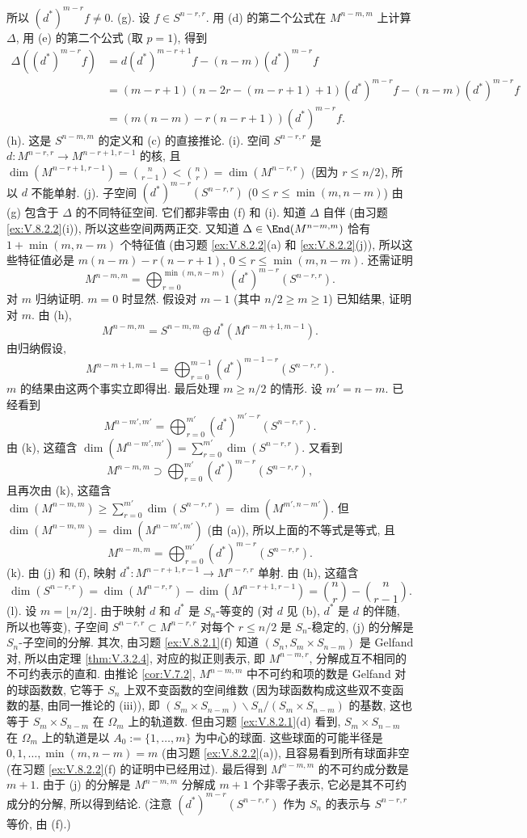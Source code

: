 \begin{solution}
所以 $(d^*)^{m-r}f \neq 0$.
(g). 设 $f \in S^{n-r,r}$. 用 (d) 的第二个公式在 $M^{n-m,m}$ 上计算 $\Delta$, 用 (e) 的第二个公式 (取 $p = 1$), 得到
\begin{align*}
\Delta((d^*)^{m-r}f) &= d(d^*)^{m-r+1}f - (n-m)(d^*)^{m-r}f \\
&= (m-r+1)(n-2r-(m-r+1)+1)(d^*)^{m-r}f - (n-m)(d^*)^{m-r}f \\
&= (m(n-m) - r(n-r+1))(d^*)^{m-r}f.
\end{align*}
(h). 这是 $S^{n-m,m}$ 的定义和 (c) 的直接推论.
(i). 空间 $S^{n-r,r}$ 是 $d \colon M^{n-r,r} \to M^{n-r+1,r-1}$ 的核, 且 $\dim(M^{n-r+1,r-1}) = \binom{n}{r-1} < \binom{n}{r} = \dim(M^{n-r,r})$ (因为 $r \leq n/2$), 所以 $d$ 不能单射.
(j). 子空间 $(d^*)^{m-r}(S^{n-r,r})$ ($0 \leq r \leq \min(m, n-m)$) 由 (g) 包含于 $\Delta$ 的不同特征空间. 它们都非零由 (f) 和 (i). 知道 $\Delta$ 自伴 (由习题 \ref{ex:V.8.2.2}(i)), 所以这些空间两两正交. 又知道 $\Delta \in \End(M^{n-m,m})$ 恰有 $1 + \min(m, n-m)$ 个特征值 (由习题 \ref{ex:V.8.2.2}(a) 和 \ref{ex:V.8.2.2}(j)), 所以这些特征值必是 $m(n-m) - r(n-r+1)$, $0 \leq r \leq \min(m, n-m)$. 还需证明
\[
M^{n-m,m} = \bigoplus_{r=0}^{\min(m,n-m)}(d^*)^{m-r}(S^{n-r,r}).
\]
对 $m$ 归纳证明. $m = 0$ 时显然. 假设对 $m - 1$ (其中 $n/2 \geq m \geq 1$) 已知结果, 证明对 $m$. 由 (h),
\[
M^{n-m,m} = S^{n-m,m} \oplus d^*(M^{n-m+1,m-1}).
\]
由归纳假设,
\[
M^{n-m+1,m-1} = \bigoplus_{r=0}^{m-1}(d^*)^{m-1-r}(S^{n-r,r}).
\]
$m$ 的结果由这两个事实立即得出.
最后处理 $m \geq n/2$ 的情形. 设 $m' = n - m$. 已经看到
\[
M^{n-m',m'} = \bigoplus_{r=0}^{m'}(d^*)^{m'-r}(S^{n-r,r}).
\]
由 (k), 这蕴含 $\dim(M^{n-m',m'}) = \sum_{r=0}^{m'}\dim(S^{n-r,r})$. 又看到
\[
M^{n-m,m} \supset \bigoplus_{r=0}^{m'}(d^*)^{m-r}(S^{n-r,r}),
\]
且再次由 (k), 这蕴含 $\dim(M^{n-m,m}) \geq \sum_{r=0}^{m'}\dim(S^{n-r,r}) = \dim(M^{m',n-m'})$. 但 $\dim(M^{n-m,m}) = \dim(M^{n-m',m'})$ (由 (a)), 所以上面的不等式是等式, 且
\[
M^{n-m,m} = \bigoplus_{r=0}^{m'}(d^*)^{m-r}(S^{n-r,r}).
\]
(k). 由 (j) 和 (f), 映射 $d^* \colon M^{n-r+1,r-1} \to M^{n-r,r}$ 单射. 由 (h), 这蕴含
\[
\dim(S^{n-r,r}) = \dim(M^{n-r,r}) - \dim(M^{n-r+1,r-1}) = \binom{n}{r} - \binom{n}{r-1}.
\]
(l). 设 $m = \lfloor n/2 \rfloor$. 由于映射 $d$ 和 $d^*$ 是 $S_n$-等变的 (对 $d$ 见 (b), $d^*$ 是 $d$ 的伴随, 所以也等变), 子空间 $S^{n-r,r} \subset M^{n-r,r}$ 对每个 $r \leq n/2$ 是 $S_n$-稳定的, (j) 的分解是 $S_n$-子空间的分解. 其次, 由习题 \ref{ex:V.8.2.1}(f) 知道 $(S_n, S_m \times S_{n-m})$ 是 Gelfand 对, 所以由定理 \ref{thm:V.3.2.4}, 对应的拟正则表示, 即 $M^{n-m,r}$, 分解成互不相同的不可约表示的直和. 由推论 \ref{cor:V.7.2}, $M^{n-m,m}$ 中不可约和项的数是 Gelfand 对的球函数数, 它等于 $S_n$ 上双不变函数的空间维数 (因为球函数构成这些双不变函数的基, 由同一推论的 (iii)), 即 $(S_m \times S_{n-m}) \backslash S_n /(S_m \times S_{n-m})$ 的基数, 这也等于 $S_m \times S_{n-m}$ 在 $\Omega_m$ 上的轨道数. 但由习题 \ref{ex:V.8.2.1}(d) 看到, $S_m \times S_{n-m}$ 在 $\Omega_m$ 上的轨道是以 $A_0 := \{1, \ldots, m\}$ 为中心的球面. 这些球面的可能半径是 $0, 1, \ldots, \min(m, n-m) = m$ (由习题 \ref{ex:V.8.2.2}(a)), 且容易看到所有球面非空 (在习题 \ref{ex:V.8.2.2}(f) 的证明中已经用过). 最后得到 $M^{n-m,m}$ 的不可约成分数是 $m + 1$. 由于 (j) 的分解是 $M^{n-m,m}$ 分解成 $m + 1$ 个非零子表示, 它必是其不可约成分的分解, 所以得到结论. (注意 $(d^*)^{m-r}(S^{n-r,r})$ 作为 $S_n$ 的表示与 $S^{n-r,r}$ 等价, 由 (f).)

\end{solution}
